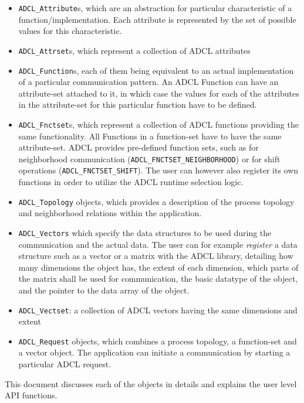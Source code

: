 \begin{itemize}
\item {\tt ADCL\_Attribute}s, which are an abstraction for particular characteristic of a function/implementation. Each attribute is represented by the set of possible values for this characteristic.
\item {\tt ADCL\_Attrset}s, which represent a collection of ADCL attributes
\item {\tt ADCL\_Function}s, each of them being equivalent to an actual implementation of a particular communication pattern. An ADCL Function can have an attribute-set attached to it, in which case the values for each of the attributes in the attribute-set for this particular function have to be defined.
\item {\tt ADCL\_Fnctset}s, which represent a collection of ADCL functions providing the same functionality. All Functions in a function-set have to have the same attribute-set. ADCL provides pre-defined function sets, such as for neighborhood communication ({\tt ADCL\_FNCTSET\_NEIGHBORHOOD}) or for shift operations ({\tt ADCL\_FNCTSET\_SHIFT}). The user can however also register its own functions in order to utilize the ADCL runtime selection logic.
\item {\tt ADCL\_Topology} objects, which provides a description of the process topology and neighborhood relations within the application.


\item {\tt ADCL\_Vectors} which specify the data structures to be used during
  the communication and the actual data. The user can for example {\it
    register} a data structure such as a vector or a matrix with the ADCL
  library, detailing how many dimensions the object has, the extent of each
  dimension, which parts of the matrix shall be used for communication, the
  basic datatype of the object, and the pointer to the data array of the
  object.
\item {\tt ADCL\_Vectset}: a collection of ADCL vectors having the same
  dimensions and extent

\item {\tt ADCL\_Request} objects, which combines a process topology, a
  function-set and a vector object. The application can initiate a
  communication by starting a particular ADCL request.
\end{itemize}

This document discusses each of the objects in details and explains the user level API functions.